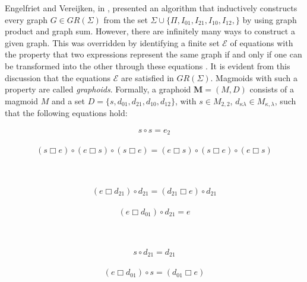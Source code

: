 \documentclass[runningheads,a4paper]{llncs}
\newcommand{\gk}{\kappa}
\newcommand{\gl}{\lambda}
\newcommand{\bx}{\mathbin{\Box}}
\newcommand{\qq}{\qquad}
\begin{document}
Engelfriet and Vereijken, in \cite{EV},  presented an algorithm that inductively constructs every graph $G\in GR(\Sigma)$ from the set $\Sigma\cup\{\Pi,I_{01},I_{21},I_{10},I_{12},\}$ by using graph product and graph sum.  However, there are infinitely many ways to construct a given graph. This was overridden  by identifying a finite set $\mathcal{E}$ of equations  with the property that two expressions represent the same graph if and only if one can be transformed into the other through these equations \cite{BK1}. It is evident from this discussion that the equations $\mathcal{E}$ are satisfied in $GR(\Sigma)$. Magmoids with such a property are called \emph{graphoids}. Formally, a graphoid $\mathbf{M}=(M,D)$ consists of a magmoid $M$ and a set $D=\{s,d_{01},d_{21},d_{10},d_{12}\}$, with $s\in M_{2,2}$, $d_{\gk\gl}\in M_{\gk,\gl}$,  such that the following equations hold:\\
\begin{minipage}[b]{70pt}
\begin{align}\label{E:3} s\circ s =e_2   \end{align}  \end{minipage}  \begin{minipage}[b]{270pt}\begin{align}\label{E:4}  \left(s \bx e \right) \circ \left( e \bx
s \right)\circ \left( s \bx e \right)   = \left( e \bx s
\right) \circ \left( s \bx e \right) \circ \left( e \bx s
\right)
\end{align}
\end{minipage}\\
\begin{minipage}[b]{170pt}
\begin{align}\label{E:5}
\left( e \bx d_{21}\right)\circ d_{21}=\left(
d_{21}\bx e \right)\circ d_{21} \end{align}  \end{minipage}\qq\quad  \begin{minipage}[b]{140pt}\begin{align}\label{E:6}    \left(e \bx d_{01}
\right)\circ d_{21}=e
\end{align}
\end{minipage}\\
\begin{minipage}[b]{120pt}
\begin{align}\label{E:7}
s\circ d_{21}=d_{21}\end{align}  \end{minipage}\qq\quad  \begin{minipage}[b]{180pt}\begin{align}\label{E:8}  \left( e\bx d_{01}
\right)\circ s = \left(
 d_{01}\bx e\right)
\end{align}
\end{minipage}\\
\end{document}
